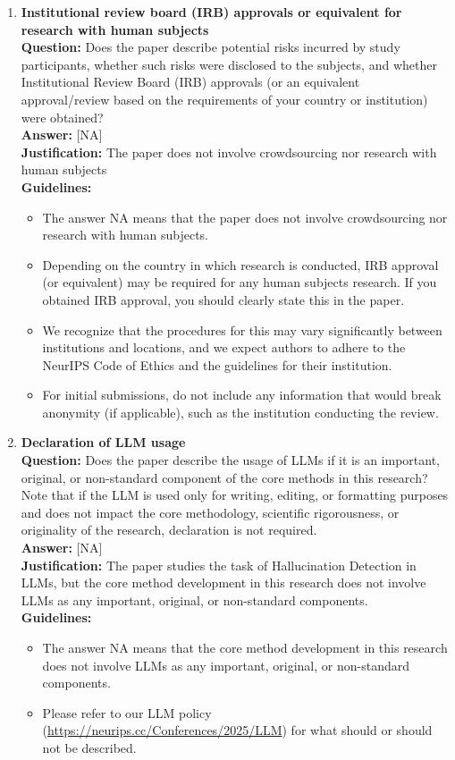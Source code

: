 \begin{enumerate}
\item \textbf{Institutional review board (IRB) approvals or equivalent for research with human subjects}\\
\textbf{Question:} Does the paper describe potential risks incurred by study participants, whether such risks were disclosed to the subjects, and whether Institutional Review Board (IRB) approvals (or an equivalent approval/review based on the requirements of your country or institution) were obtained?\\
\textbf{Answer:} [NA]\\
\textbf{Justification:} The paper does not involve crowdsourcing nor research with human subjects\\
\textbf{Guidelines:}
\begin{itemize}
\item The answer NA means that the paper does not involve crowdsourcing nor research with human subjects.
\item Depending on the country in which research is conducted, IRB approval (or equivalent) may be required for any human subjects research. If you obtained IRB approval, you should clearly state this in the paper.
\item We recognize that the procedures for this may vary significantly between institutions and locations, and we expect authors to adhere to the NeurIPS Code of Ethics and the guidelines for their institution.
\item For initial submissions, do not include any information that would break anonymity (if applicable), such as the institution conducting the review.
\end{itemize}

\item \textbf{Declaration of LLM usage}\\
\textbf{Question:} Does the paper describe the usage of LLMs if it is an important, original, or non-standard component of the core methods in this research? Note that if the LLM is used only for writing, editing, or formatting purposes and does not impact the core methodology, scientific rigorousness, or originality of the research, declaration is not required.\\
\textbf{Answer:} [NA]\\
\textbf{Justification:} The paper studies the task of Hallucination Detection in LLMs, but the core method development in this research does not involve LLMs as any important, original, or non-standard components.\\
\textbf{Guidelines:}
\begin{itemize}
\item The answer NA means that the core method development in this research does not involve LLMs as any important, original, or non-standard components.
\item Please refer to our LLM policy (\url{https://neurips.cc/Conferences/2025/LLM}) for what should or should not be described.
\end{itemize}

\end{enumerate}
